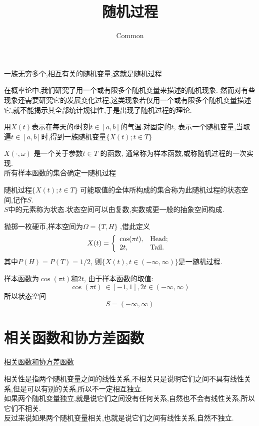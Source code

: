 \documentclass{article}
\begin{document}
\title{随机过程}
\author{Common}

一族无穷多个,相互有关的随机变量,这就是随机过程

在概率论中,我们研究了用一个或有限多个随机变量来描述的随机现象.
然而对有些现象还需要研究它的发展变化过程,这类现象若仅用一个或有限多个随机变量描述它,就不能揭示其全部统计规律性,于是出现了随机过程的理论.
\begin{example}
用$X(t)$表示在每天的$t$时刻$t \in [a, b]$的气温.对固定的$t$,
表示一个随机变量,当取遍$t \in [a,b ]$时,得到一族随机变量$\{X(t); t \in T\}$
\end{example}

$X(\cdot, \omega)$ 是一个关于参数$t \in T$ 的函数, 通常称为样本函数,或称随机过程的一次实现.\\
所有样本函数的集合确定一随机过程

随机过程$\{X(t);t \in T\}$ 可能取值的全体所构成的集合称为此随机过程的状态空间,记作$S$.\\
$S$中的元素称为状态.状态空间可以由复数,实数或更一般的抽象空间构成.

\begin{example}
抛掷一枚硬币,样本空间为$\Omega = \{T, H\}$ ,借此定义
$$
X(t)=
\left\{
  \begin{array}{ll}
   \cos(\pi t) , & \hbox{Head;} \\
    2t, & \hbox{Tail.}
  \end{array}
\right.
$$
其中$P(H)=P(T)=1/2$, 则$\{X(t), t \in (-\infty, \infty)\}$是一随机过程.

样本函数为$\cos(\pi t)$和$2t$, 由于样本函数的取值:
$$\cos(\pi t)\ \in [-1,1], 2t \in (-\infty, \infty)$$
所以状态空间
$$S=(-\infty, \infty)$$
\end{example}

\section{相关函数和协方差函数}
\href{http://202.117.122.42:9001/xhxt/xhyxt/xuexi/chart9/c\_9\_3\_2\_001.htm}{相关函数和协方差函数}

相关性是指两个随机变量之间的线性关系,不相关只是说明它们之间不具有线性关系,但是可以有别的关系,所以不一定相互独立.\\
如果两个随机变量独立,就是说它们之间没有任何关系,自然也不会有线性关系,所以它们不相关.\\
反过来说如果两个随机变量相关,也就是说它们之间有线性关系,自然不独立.
\end{document}
